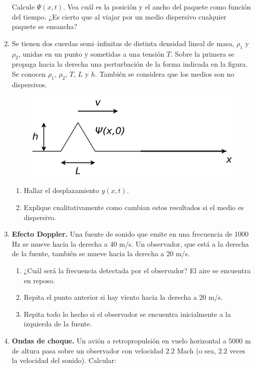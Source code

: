 \documentclass[11pt,spanish,a4paper]{article}
\begin{document}
\begin{enumerate}
\[\]
Calcule $\Psi(x,t)$. Vea cuál es la posición y el ancho del paquete
como función del tiempo. ¿Es cierto que al viajar por un medio dispersivo
cualquier paquete se ensancha?
\item Se tienen dos cuerdas semi--infinitas de distinta densidad lineal
de masa, $\rho_{1}$ y $\rho_{2}$, unidas en un punto y sometidas
a una tensión $T$. Sobre la primera se propaga hacia la derecha una
perturbación de la forma indicada en la figura. Se conocen $\rho_{1}$,
$\rho_{2}$, $T$, $L$ y $h$. También se considera que los medios
son no dispersivos.
\begin{figure}[H]
\centering{}\includegraphics[clip,scale=0.25]{ej2-20}
\end{figure}


\begin{enumerate}
\item Hallar el desplazamiento $y(x,t)$.
\item Explique cualitativamente como cambian estos resultados si el medio
es dispersivo.
\end{enumerate}
\item \textbf{Efecto Doppler. }Una fuente de sonido que emite en una frecuencia
de 1000 Hz se mueve hacia la derecha a 40 m/s. Un observador, que
está a la derecha de la fuente, también se mueve hacia la derecha
a 20 m/s.

\begin{enumerate}
\item ¿Cuál será la frecuencia detectada por el observador? El aire se encuentra
en reposo.
\item Repita el punto anterior si hay viento hacia la derecha a 20 m/s.
\item Repita todo lo hecho si el observador se encuentra inicialmente a
la izquierda de la fuente.
\end{enumerate}
\item \textbf{Ondas de choque.} Un avión a retropropulsión en vuelo horizontal
a 5000 m de altura pasa sobre un observador con velocidad $2.2$ Mach
(o sea, $2.2$ veces la velocidad del sonido). Calcular:


\end{enumerate}
\end{document}
